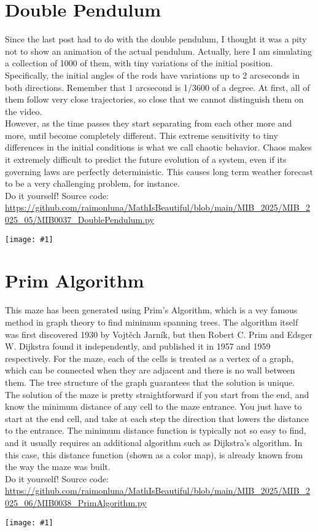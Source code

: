\documentclass[12pt,landscape]{article}
\newcommand{\artpage}[3][]{%
  \begin{minipage}[t]{0.48\linewidth}
    \vspace{0pt} %
    \section*{#2} %
    \addcontentsline{toc}{section}{#2} %
    #3 %
  \end{minipage}%
  \hfill
  \begin{minipage}[t]{0.48\linewidth}
    \vspace{0pt} %
    \centering
    \texttt{[image: \#1]}
  \end{minipage}%
  \newpage
}
\begin{document}
\artpage[../Output/LowQuality/MIB0037_DoublePendulum.png]{Double Pendulum}{%
Since the last post had to do with the double pendulum, I thought it was a pity not to show an animation of the actual pendulum. Actually, here I am simulating a collection of 1000 of them, with tiny variations of the initial position. Specifically, the initial angles of the rods have variations up to 2 arcseconds in both directions. Remember that 1 arcsecond is 1/3600 of a degree. At first, all of them follow very close trajectories, so close that we cannot distinguish them on the video. \\

However, as the time passes they start separating from each other more and more, until become completely different. This extreme sensitivity to tiny differences in the initial conditions is what we call chaotic behavior. Chaos makes it extremely difficult to predict the future evolution of a system, even if its governing laws are perfectly deterministic. This causes long term weather forecast to be a very challenging problem, for instance.\\

Do it yourself! Source code: \url{https://github.com/raimonluna/MathIsBeautiful/blob/main/MIB_2025/MIB_2025_05/MIB0037_DoublePendulum.py}
}

\artpage[../Output/LowQuality/MIB0038_PrimAlgorithm.png]{Prim Algorithm}{%
This maze has been generated using Prim's Algorithm, which is a vey famous method in graph theory to find minimum spanning trees. The algorithm itself was first discovered 1930 by Vojtěch Jarník, but then Robert C. Prim and Edsger W. Dijkstra found it independently, and published it in 1957 and 1959 respectively. For the maze, each of the cells is treated as a vertex of a graph, which can be connected when they are adjacent and there is no wall between them. The tree structure of the graph guarantees that the solution is unique.\\

The solution of the maze is pretty straightforward if you start from the end, and know the minimum distance of any cell to the maze entrance. You just have to start at the end cell, and take at each step the direction that lowers the distance to the entrance. The minimum distance function is typically not so easy to find, and it usually requires an additional algorithm such as Dijkstra's algorithm. In this case, this distance function (shown as a color map), is already known from the way the maze was built.\\

Do it yourself! Source code: \url{https://github.com/raimonluna/MathIsBeautiful/blob/main/MIB_2025/MIB_2025_06/MIB0038_PrimAlgorithm.py}
}
\end{document}

